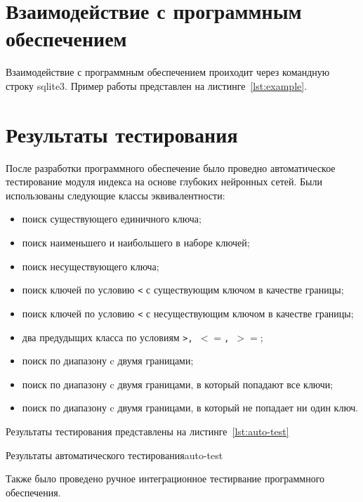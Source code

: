 {
\captionsetup{format=hang,justification=raggedright,
              singlelinecheck=off,width=16cm}
}

\section{Взаимодействие с программным обеспечением}

Взаимодействие с программным обеспечением проиходит через командную строку
sqlite3. Пример работы представлен на листинге~\ref{lst:example}.

{
\captionsetup{format=hang,justification=raggedright,
              singlelinecheck=off,width=16cm}
}

\section{Результаты тестирования}

После разработки программного обеспечение было проведно автоматическое
тестирование модуля индекса на основе глубоких нейронных сетей. Были
использованы следующие классы эквивалентности:

\begin{itemize}
    \item поиск существующего единичного ключа;
    \item поиск наименьшего и наибольшего в наборе ключей;
    \item поиск несуществующего ключа;
    \item поиск ключей по условию \texttt{<} с существующим ключом в качестве
        границы;
    \item поиск ключей по условию \texttt{<} с несуществующим ключом в качестве
        границы;
    \item два предудыщих класса по условиям \texttt{>, $<=$, $>=$};
    \item поиск по диапазону c двумя границами;
    \item поиск по диапазону c двумя границами, в который попадают все ключи;
    \item поиск по диапазону c двумя границами, в который не попадает ни один
        ключ.
\end{itemize}

Результаты тестирования представлены на листинге~\ref{lst:auto-test}

{}{Результаты автоматического тестирования}{auto-test}{}



Также было проведено ручное интеграционное тестирвание программного обеспечения.

